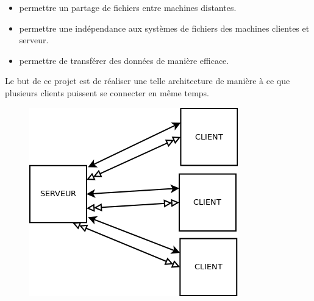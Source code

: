 \begin{itemize}
    \item{}
	 permettre un partage de fichiers entre machines distantes.
    \item{}
	 permettre une indépendance aux systèmes de fichiers des machines clientes et serveur.
    \item{}
	permettre de transférer des données de manière efficace.
\end{itemize}


Le but de ce projet est de réaliser une telle architecture de manière à ce que plusieurs clients puissent se connecter en même temps.
\begin{figure}[!h] 
\begin{center}
  \includegraphics{cs2.png}
\end{center}
\end{figure} 
